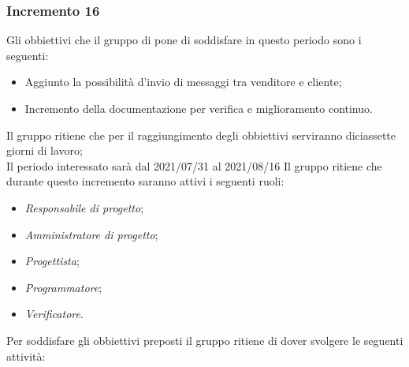 \subsubsection{Incremento 16}
Gli obbiettivi che il gruppo di pone di soddisfare in questo periodo sono i seguenti:
\begin{itemize}
    \item Aggiunto la possibilità d'invio di messaggi tra venditore e cliente;
    \item Incremento della documentazione per verifica e miglioramento continuo.
\end{itemize}
Il gruppo ritiene che per il raggiungimento degli obbiettivi serviranno diciassette giorni di lavoro;\\
Il periodo interessato sarà dal 2021/07/31 al 2021/08/16
Il gruppo ritiene che durante questo incremento saranno attivi i seguenti ruoli:
\begin{itemize}
    \item \textit{Responsabile di progetto};
    \item \textit{Amministratore di progetto};
    \item \textit{Progettista};
    \item \textit{Programmatore};
    \item \textit{Verificatore}.
\end{itemize}
Per soddisfare gli obbiettivi preposti il gruppo ritiene di dover svolgere le seguenti attività:
